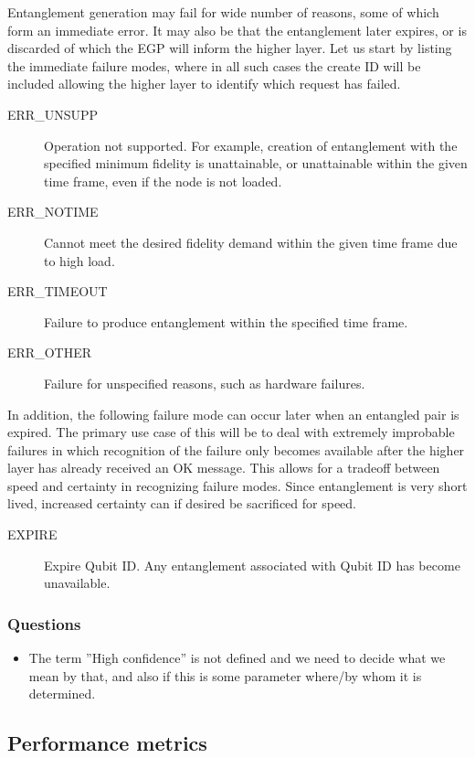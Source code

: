 \documentclass{article}
\begin{document}
Entanglement generation may fail for wide number of reasons, some of which form an immediate error. It may also be that the entanglement later expires, or is discarded
of which the EGP will inform the higher layer. Let us start by listing the immediate failure modes, where in all such cases the create ID will be included allowing the
higher layer to identify which request has failed.\\
\begin{description}
\item[ERR\_UNSUPP] Operation not supported. For example, creation of entanglement with the specified minimum fidelity is unattainable, or 
unattainable within the given time frame, even if the node is not loaded. 
\item[ERR\_NOTIME] Cannot meet the desired fidelity demand within the given time frame due to high load.
\item[ERR\_TIMEOUT] Failure to produce entanglement within the specified time frame.
\item[ERR\_OTHER] Failure for unspecified reasons, such as hardware failures.
\end{description}
In addition, the following failure mode can occur later when an entangled pair is expired. The primary use case of this will be to deal with extremely improbable failures
in which recognition of the failure only becomes available after the higher layer has already received an OK message. This allows for 
a tradeoff between speed and certainty in recognizing failure modes. Since entanglement is very short lived, increased certainty can if desired be sacrificed for speed.
\begin{description}
\item[EXPIRE] Expire Qubit ID. Any entanglement associated with Qubit ID has become unavailable.
\end{description}

\subsubsection{Questions}
\begin{itemize}
\item The term ''High confidence'' is not defined and we need to decide what we mean by that, and also if this is some parameter where/by whom it is determined.
\end{itemize}

\subsection{Performance metrics}
\end{document}
